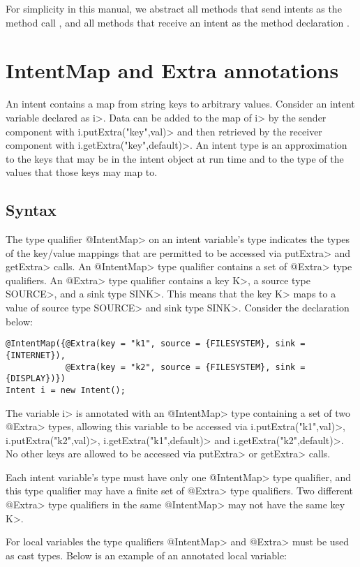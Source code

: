For simplicity in this manual, we abstract all methods that send intents as the
method call \sendIntent{}, and all methods that receive an intent as the method
declaration \onReceive{}.

\section{IntentMap and Extra annotations}
An intent contains a map from string keys to arbitrary values. Consider an
intent variable declared as \<i>. Data can be added to the map of \<i> by
the sender component with \<i.putExtra("key",val)> and then retrieved by the
receiver component with \<i.getExtra("key",default)>. An intent type is an
approximation to the keys that may be in the intent object at run time and to
the type of the values that those keys may map to.

\subsection{Syntax}
The type qualifier \<@IntentMap> on an intent variable's type indicates the
types of the key/value mappings that are permitted to be accessed via
\<putExtra> and \<getExtra> calls.
An \<@IntentMap> type qualifier contains a set of \<@Extra> type qualifiers. An
\<@Extra> type qualifier contains a key \<K>, a source type \<SOURCE>, and a 
sink type \<SINK>. This means that the key \<K> maps to a value of source type 
\<SOURCE> and sink type \<SINK>. Consider the declaration below:

\begin{Verbatim}
@IntentMap({@Extra(key = "k1", source = {FILESYSTEM}, sink = {INTERNET}),
            @Extra(key = "k2", source = {FILESYSTEM}, sink = {DISPLAY})}) 
Intent i = new Intent();
\end{Verbatim}

The variable \<i> is annotated with an \<@IntentMap> type containing a set of
two \<@Extra> types, allowing this variable to be accessed via
\<i.putExtra("k1",val)>, \<i.putExtra("k2",val)>,
\<i.getExtra("k1",default)> and \<i.getExtra("k2",default)>. No other keys are
allowed to be accessed via \<putExtra> or \<getExtra> calls. 

Each intent variable's type must have only one \<@IntentMap> type qualifier, and
this type qualifier may have a finite set of \<@Extra> type qualifiers. Two
different \<@Extra> type qualifiers in the same \<@IntentMap> may not have the
same key \<K>.

For local variables the type qualifiers \<@IntentMap> and \<@Extra> must be used
as cast types. Below is an example of an annotated local variable:

